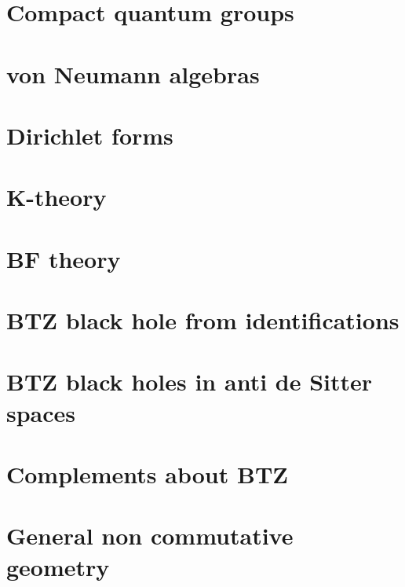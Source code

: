 \chapter{Compact quantum groups}


\chapter{von Neumann algebras}





\chapter{Dirichlet forms}


\chapter{K-theory}


\chapter{BF theory}


\chapter{BTZ black hole from identifications}




\chapter{BTZ black holes in anti de Sitter spaces}                  \label{ChapBHinAdS}
%
%









\chapter{Complements about BTZ}


\chapter{General non commutative geometry}





